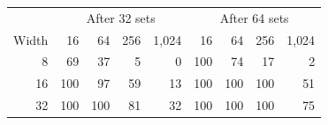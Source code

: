 \begin{tabular}{@{}rrrrr@{\qquad}rrrr@{}}
\toprule
 & \multicolumn{4}{c}{After 32 sets} & \multicolumn{4}{c}{After 64 sets} \\
Width & 16 & 64 & 256 & 1{,}024 & 16 & 64 & 256 & 1{,}024 \\
\midrule
8 & 69 & 37 & 5 & 0 & 100 & 74 & 17 & 2 \\
16 & 100 & 97 & 59 & 13 & 100 & 100 & 100 & 51 \\
32 & 100 & 100 & 81 & 32 & 100 & 100 & 100 & 75 \\
\bottomrule
\end{tabular}
